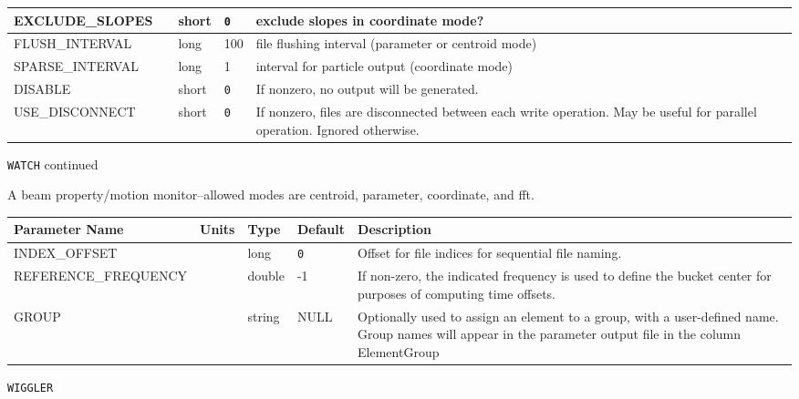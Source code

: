 \begin{tabular}{|l|l|l|l|p{\descwidth}|}
EXCLUDE\_SLOPES &  & short &  \verb|0| & exclude slopes in coordinate mode?  \\ \hline 
FLUSH\_INTERVAL &  & long &   100             & file flushing interval (parameter or centroid mode)  \\ \hline 
SPARSE\_INTERVAL &  & long &   1               & interval for particle output (coordinate mode)  \\ \hline 
DISABLE &  & short &  \verb|0| & If nonzero, no output will be generated.  \\ \hline 
USE\_DISCONNECT &  & short &  \verb|0| & If nonzero, files are disconnected between each write operation. May be useful for parallel operation.  Ignored otherwise.  \\ \hline 
\end{tabular}

\newpage
\begin{center}{\Large\verb|WATCH| continued}\end{center}
A beam property/motion monitor--allowed modes are centroid, parameter, coordinate, and fft.
\\
\begin{tabular}{|l|l|l|l|p{\descwidth}|} \hline
Parameter Name & Units & Type & Default & Description \\ \hline 
INDEX\_OFFSET &  & long &  \verb|0| & Offset for file indices for sequential file naming.  \\ \hline 
REFERENCE\_FREQUENCY &  & double &   -1 & If non-zero, the indicated frequency is used to define the bucket center for purposes of computing time offsets.  \\ \hline 
GROUP &  & string & NULL & Optionally used to assign an element to a group, with a user-defined name.  Group names will appear in the parameter output file in the column ElementGroup  \\ \hline 
\end{tabular}

\vspace*{0.5in}

\newpage
\begin{center}{\Large\verb|WIGGLER|}\end{center}
